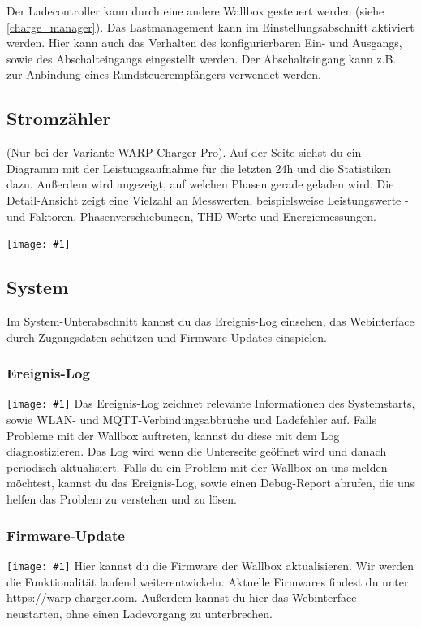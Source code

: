 \documentclass[a4paper,10pt]{article}
\newcommand{\gfx}[1]{\texttt{[image: \#1]}}
\begin{document}
\begin{multicols*}{2}
	Der Ladecontroller kann durch eine andere Wallbox gesteuert werden (siehe \ref{charge_manager}).
	Das Lastmanagement kann im Einstellungsabschnitt aktiviert werden. Hier kann auch das Verhalten des
	konfigurierbaren Ein- und Ausgangs, sowie des Abschalteingangs eingestellt werden. Der Abschalteingang
	kann z.B. zur Anbindung eines Rundsteuerempfängers verwendet werden.

	\subsection{Stromzähler}
	(Nur bei der Variante WARP Charger Pro). Auf der Seite
	siehst du ein Diagramm mit der Leistungsaufnahme für die letzten 24h und die
	Statistiken dazu. Außerdem wird angezeigt, auf welchen Phasen gerade geladen wird.
	Die Detail-Ansicht zeigt eine Vielzahl an Messwerten, beispielsweise Leistungswerte -und Faktoren,
	Phasenverschiebungen, THD-Werte und Energiemessungen.

	\gfx{./img_warp2/resized/web_meter}

	\subsection{System}
	Im System-Unterabschnitt kannst du das Ereignis-Log einsehen, das Webinterface durch Zugangsdaten schützen und Firmware-Updates einspielen.
	\subsubsection{Ereignis-Log}
	\gfx{./img_warp2/resized/web_event_log}
	Das Ereignis-Log zeichnet relevante Informationen des Systemstarts, sowie WLAN- und MQTT-Verbindungsabbrüche und Ladefehler auf.
	Falls Probleme mit der Wallbox auftreten, kannst du diese mit dem Log diagnostizieren.
	Das Log wird wenn die Unterseite geöffnet wird und danach periodisch aktualisiert.
	Falls du ein Problem mit der Wallbox an uns melden möchtest, kannst du das Ereignis-Log,
	sowie einen Debug-Report abrufen, die uns helfen das Problem zu verstehen und zu lösen.

	\subsubsection{Firmware-Update}
	\gfx{./img_warp2/resized/web_firmware_update}
	Hier kannst du die Firmware der Wallbox aktualisieren. Wir werden die Funktionalität
	laufend weiterentwickeln. Aktuelle Firmwares findest du unter \url{https://warp-charger.com}.
	Außerdem kannst du hier das Webinterface neustarten, ohne einen Ladevorgang zu unterbrechen.


\end{multicols*}
\end{document}
